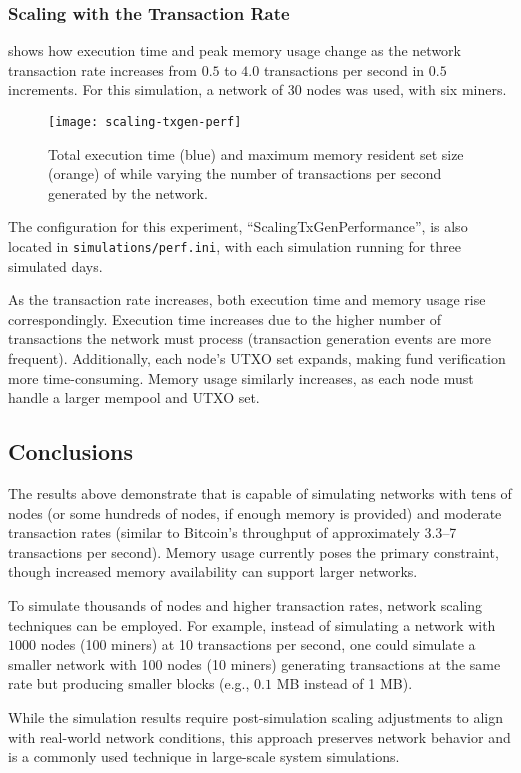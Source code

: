 \subsubsection{Scaling with the Transaction Rate}\label{subsubsec:scaling-tx}

 shows how execution time and peak memory usage change
as the network transaction rate increases from \(0.5\) to \(4.0\) transactions
per second in \(0.5\) increments. For this simulation, a network of 30 nodes
was used, with six miners.

\begin{figure}[tbhp]
	\centering
	\texttt{[image: scaling-txgen-perf]}
	\caption{Total execution time (blue) and maximum memory resident set
	size (orange) of \iblock{} while varying the number of transactions per
	second generated by the network.}\label{fig:scaling-tx}
\end{figure}

The configuration for this experiment, ``ScalingTxGenPerformance'', is also
located in \texttt{simulations/perf.ini}, with each simulation running for
three simulated days.

As the transaction rate increases, both execution time and memory usage rise
correspondingly. Execution time increases due to the higher number of
transactions the network must process (transaction generation events are more
frequent). Additionally, each node's UTXO set expands, making fund
verification more time-consuming. Memory usage similarly increases, as each
node must handle a larger mempool and UTXO set.

\subsection{Conclusions}\label{subsec:performance-conclusions}

The results above demonstrate that \iblock{} is capable of simulating networks
with tens of nodes (or some hundreds of nodes, if enough memory is provided)
and moderate transaction rates (similar to Bitcoin's throughput of
approximately \(3.3\)--7 transactions per second). Memory usage currently poses
the primary constraint, though increased memory availability can support larger
networks.

To simulate thousands of nodes and higher transaction rates, network scaling
techniques can be employed. For example, instead of simulating a network with
\(1000\) nodes (100 miners) at 10 transactions per second, one could simulate a
smaller network with 100 nodes (10 miners) generating transactions at the same
rate but producing smaller blocks (e.g., \(0.1\) MB instead of 1 MB).

While the simulation results require post-simulation scaling adjustments to
align with real-world network conditions, this approach preserves network
behavior and is a commonly used technique in large-scale system simulations.
